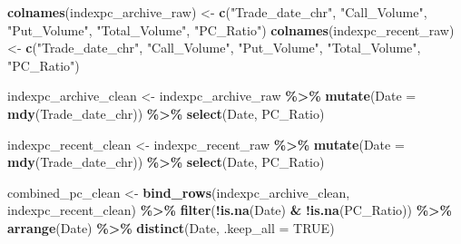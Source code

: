 \documentclass[
]{article}
\newenvironment{Shaded}{\begin{snugshade}}{\end{snugshade}}
\newcommand{\AttributeTok}[1]{\textcolor[rgb]{0.13,0.29,0.53}{#1}}
\newcommand{\ConstantTok}[1]{\textcolor[rgb]{0.56,0.35,0.01}{#1}}
\newcommand{\FunctionTok}[1]{\textcolor[rgb]{0.13,0.29,0.53}{\textbf{#1}}}
\newcommand{\NormalTok}[1]{#1}
\newcommand{\OtherTok}[1]{\textcolor[rgb]{0.56,0.35,0.01}{#1}}
\newcommand{\SpecialCharTok}[1]{\textcolor[rgb]{0.81,0.36,0.00}{\textbf{#1}}}
\newcommand{\StringTok}[1]{\textcolor[rgb]{0.31,0.60,0.02}{#1}}
\begin{document}
\begin{Shaded}
\begin{Highlighting}[]
  \FunctionTok{colnames}\NormalTok{(indexpc\_archive\_raw) }\OtherTok{\textless{}{-}} \FunctionTok{c}\NormalTok{(}\StringTok{"Trade\_date\_chr"}\NormalTok{, }\StringTok{"Call\_Volume"}\NormalTok{, }\StringTok{"Put\_Volume"}\NormalTok{, }\StringTok{"Total\_Volume"}\NormalTok{, }\StringTok{"PC\_Ratio"}\NormalTok{)}
  \FunctionTok{colnames}\NormalTok{(indexpc\_recent\_raw) }\OtherTok{\textless{}{-}} \FunctionTok{c}\NormalTok{(}\StringTok{"Trade\_date\_chr"}\NormalTok{, }\StringTok{"Call\_Volume"}\NormalTok{, }\StringTok{"Put\_Volume"}\NormalTok{, }\StringTok{"Total\_Volume"}\NormalTok{, }\StringTok{"PC\_Ratio"}\NormalTok{)}
  
\NormalTok{  indexpc\_archive\_clean }\OtherTok{\textless{}{-}}\NormalTok{ indexpc\_archive\_raw }\SpecialCharTok{\%\textgreater{}\%}
    \FunctionTok{mutate}\NormalTok{(}\AttributeTok{Date =} \FunctionTok{mdy}\NormalTok{(Trade\_date\_chr)) }\SpecialCharTok{\%\textgreater{}\%}
    \FunctionTok{select}\NormalTok{(Date, PC\_Ratio)}
  
\NormalTok{  indexpc\_recent\_clean }\OtherTok{\textless{}{-}}\NormalTok{ indexpc\_recent\_raw }\SpecialCharTok{\%\textgreater{}\%}
    \FunctionTok{mutate}\NormalTok{(}\AttributeTok{Date =} \FunctionTok{mdy}\NormalTok{(Trade\_date\_chr)) }\SpecialCharTok{\%\textgreater{}\%}
    \FunctionTok{select}\NormalTok{(Date, PC\_Ratio)}
    
\NormalTok{  combined\_pc\_clean }\OtherTok{\textless{}{-}} \FunctionTok{bind\_rows}\NormalTok{(indexpc\_archive\_clean, indexpc\_recent\_clean) }\SpecialCharTok{\%\textgreater{}\%}
    \FunctionTok{filter}\NormalTok{(}\SpecialCharTok{!}\FunctionTok{is.na}\NormalTok{(Date) }\SpecialCharTok{\&} \SpecialCharTok{!}\FunctionTok{is.na}\NormalTok{(PC\_Ratio)) }\SpecialCharTok{\%\textgreater{}\%}
    \FunctionTok{arrange}\NormalTok{(Date) }\SpecialCharTok{\%\textgreater{}\%}
    \FunctionTok{distinct}\NormalTok{(Date, }\AttributeTok{.keep\_all =} \ConstantTok{TRUE}\NormalTok{)}
  

\end{Highlighting}
\end{Shaded}
\end{document}
